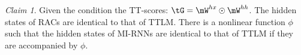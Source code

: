 \documentclass{article}
\theoremstyle{plain}
\theoremstyle{definition}
\theoremstyle{remark}
\newtheorem{claim}[theorem]{Claim}
\begin{document}









\begin{claim}
\label{cm: G and RACs} Given the condition the TT-scores: $\tG = \mW^{hx} \odot \mW^{hh}$. 
The hidden states of RACs are identical to that of TTLM. There is a nonlinear function $\phi$ such that the hidden states of MI-RNNs are identical to that of TTLM if they are accompanied by $\phi$.   
\end{claim}

\end{document}
